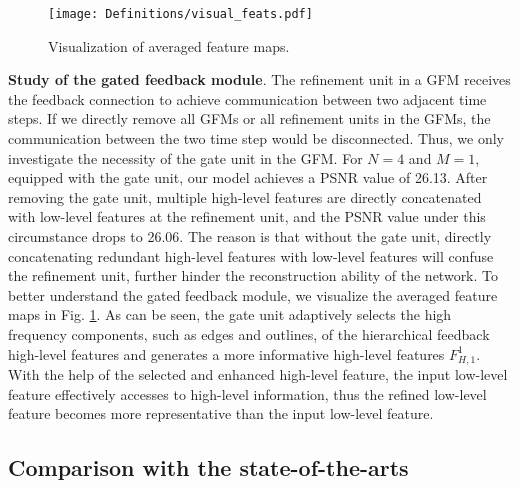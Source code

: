 \documentclass{bmvc2k}
\begin{document}
	
\begin{figure}[htbp]
	\centering
	{\texttt{[image: Definitions/visual\_feats.pdf]}} 
	\vspace{-5mm}
	\caption{Visualization of averaged feature maps.}
	\label{fig:feat}
	\vspace{-4mm}
\end{figure}
	
	\noindent \textbf{Study of the gated feedback module}. The refinement unit in a GFM receives the feedback connection to achieve communication between two adjacent time steps. If we directly remove all GFMs or all refinement units in the GFMs, the communication between the two time step would be disconnected. Thus, we only investigate the necessity of the gate unit in the GFM. For $N=4$ and $M=1$, equipped with the gate unit, our model achieves a PSNR value of 26.13. After removing the gate unit, multiple high-level features are directly concatenated with low-level features at the refinement unit, and the PSNR value under this circumstance drops to 26.06. The reason is that without the gate unit, directly concatenating redundant high-level features with low-level features will confuse the refinement unit, further hinder the reconstruction ability of the network. To better understand the gated feedback module, we visualize the averaged feature maps in Fig. \ref{fig:feat}. As can be seen, the gate unit adaptively selects the high frequency components, such as edges and outlines, of the hierarchical feedback high-level features and generates a more informative high-level features $F_{H,1}^1$. With the help of the selected and enhanced high-level feature, the input low-level feature effectively accesses to high-level information, thus the refined low-level feature becomes more representative than the input low-level feature.


	\subsection{Comparison with the state-of-the-arts}

	\setlength{\parskip}{0\baselineskip}
	
\end{document}
